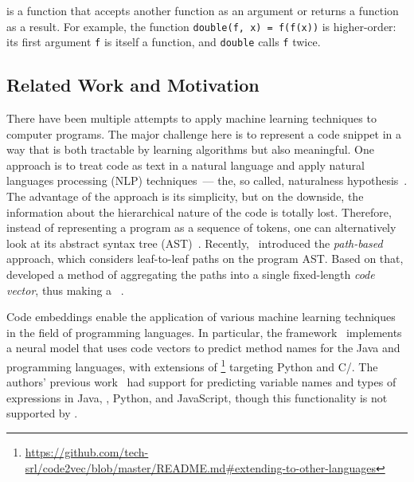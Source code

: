 \documentclass[12pt]{article}
\begin{document}
 is a function that accepts another function as an argument
or returns a function as a result. For example, the function \texttt{double(f, x) = f(f(x))}
is higher-order: its first argument \texttt{f} is itself a function, 
and \texttt{double} calls \texttt{f} twice.

\subsection{Related Work and Motivation}



There have been multiple attempts to apply machine learning techniques
to computer programs. The major challenge here is to represent a code snippet
in a way that is both tractable by learning algorithms but also meaningful.
One approach is to treat code as text in a natural language
and apply natural languages processing (NLP) techniques~--- the, so called, 
naturalness hypothesis~\cite{Allamanis2018}. The advantage of the approach
is its simplicity, but on the downside, the information 
about the hierarchical nature of the code is totally lost.
Therefore, instead of representing a program as a sequence of tokens,
one can alternatively look at its abstract syntax tree (AST)~\cite{Raychev2016,Allamanis2018}.
Recently,~\citet{Alon2018} introduced the \emph{path-based} approach, 
which considers leaf-to-leaf paths on the program AST.
Based on that, \citet{code2vec} developed a method of aggregating the paths
into a single fixed-length \emph{code vector}, 
thus making a ~\cite{Allamanis2015}.

Code embeddings enable the application of various machine learning techniques 
in the field of programming languages.
In particular, the \cv framework~\cite{code2vec} implements a neural model
that uses code vectors to predict method names for the Java and \csharp programming languages,
with extensions of \cv\footnote{
\scriptsize\url{https://github.com/tech-srl/code2vec/blob/master/README.md\#extending-to-other-languages}} 
targeting Python and C/\cpp.
The authors' previous work~\cite{Alon2018} had support for predicting
variable names and types of expressions in Java, \csharp, Python, and JavaScript,
though this functionality is not supported by \cv.
\end{document}

